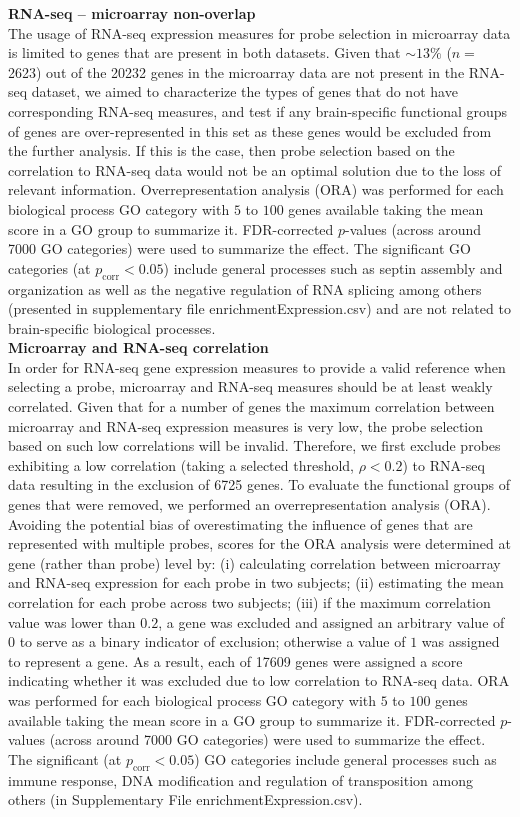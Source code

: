 \documentclass[10pt,A4]{article}
\begin{document}
\textbf{RNA-seq – microarray non-overlap}\\
The usage of RNA-seq expression measures for probe selection in microarray data is limited to genes that are present in both datasets. Given that $\sim13\%$ ($n=$\num{2623}) out of the  \num{20232} genes in the microarray data are not present in the RNA-seq dataset, we aimed to characterize the types of genes that do not have corresponding RNA-seq measures, and test if any brain-specific functional groups of genes are over-represented in this set as these genes would be excluded from the further analysis. If this is the case, then probe selection based on the correlation to RNA-seq data would not be an optimal solution due to the loss of relevant information. Overrepresentation analysis (ORA) was performed for each biological process GO category with $5$ to $100$ genes available taking the mean score in a GO group to summarize it. FDR-corrected $p$-values (across around \num{7000} GO categories) were used to summarize the effect. The significant GO categories (at $p_\mathrm{corr}<0.05$) include general processes such as septin assembly and organization as well as the negative regulation of RNA splicing among others (presented in supplementary file enrichmentExpression.csv) and are not related to brain-specific biological processes. \\

\textbf{Microarray and RNA-seq correlation}\\
In order for RNA-seq gene expression measures to provide a valid reference when selecting a probe, microarray and RNA-seq measures should be at least weakly correlated. Given that for a number of genes the maximum correlation between microarray and RNA-seq expression measures is very low, the probe selection based on such low correlations will be invalid. Therefore, we first exclude probes exhibiting a low correlation (taking a selected threshold, $\rho < 0.2$) to RNA-seq data resulting in the exclusion of \num{6725} genes. To evaluate the functional groups of genes that were removed, we performed an overrepresentation analysis (ORA). Avoiding the potential bias of overestimating the influence of genes that are represented with multiple probes, scores for the ORA analysis were determined at gene (rather than probe) level by: (i) calculating correlation between microarray and RNA-seq expression for each probe in two subjects; (ii) estimating the mean correlation for each probe across two subjects; (iii) if the maximum correlation value was lower than $0.2$, a gene was excluded and assigned an arbitrary value of $0$ to serve as a binary indicator of exclusion; otherwise a value of $1$ was assigned to represent a gene. As a result, each of \num{17609} genes were assigned a score indicating whether it was excluded due to low correlation to RNA-seq data. ORA was performed for each biological process GO category with $5$ to $100$ genes available taking the mean score in a GO group to summarize it. FDR-corrected $p$-values (across around \num{7000} GO categories) were used to summarize the effect. The significant (at $p_\mathrm{corr}<0.05$) GO categories include general processes such as immune response, DNA modification and regulation of transposition among others (in Supplementary File enrichmentExpression.csv).
\end{document}
